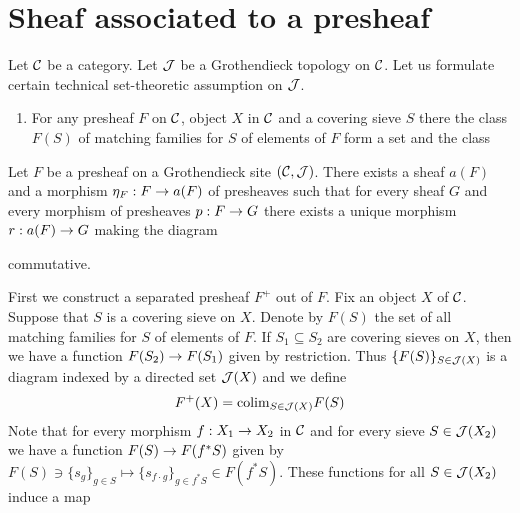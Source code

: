 \section{Sheaf associated to a presheaf}
\noindent
Let ${\mathcal C}$ be a category. 
\noindent
Let ${\mathcal J}$ be a Grothendieck topology on ${\mathcal C}$. Let us formulate certain technical set-theoretic assumption on ${\mathcal J}$.
\begin{enumerate}[label=\textbf{($\star$)}, leftmargin=1.5em]
\item For any presheaf $F$ on ${\mathcal C}$, object $X$ in ${\mathcal C}$ and a covering sieve $S$ there the class $F(S)$ of matching families for $S$ of elements of $F$ form a set and the class 
\end{enumerate}

\begin{theorem}\label{theorem:associatedsheaf}
Let $F$ be a presheaf on a Grothendieck site $({\mathcal C},{\mathcal J})$. There exists a sheaf $a(F)$ and a morphism $\eta_F:F \rightarrow a(F)$ of presheaves such that for every sheaf $G$ and every morphism of presheaves $p:F \rightarrow G$ there exists a unique morphism $r:a(F)\rightarrow G$ making the diagram
\begin{center}
\end{center}
commutative.
\end{theorem}
\noindent
First we construct a separated presheaf $F^+$ out of $F$. Fix an object $X$ of ${\mathcal C}$. Suppose that $S$ is a covering sieve on $X$. Denote by $F(S)$ the set of all matching families for $S$ of elements of $F$. If $S_1\subseteq S_2$ are covering sieves on $X$, then we have a function $F(S_2)\rightarrow F(S_1)$ given by restriction. Thus $\{F(S)\}_{S\in {\mathcal J}(X)}$ is a diagram indexed by a directed set ${\mathcal J}(X)$ and we define
$$F^+(X)=\mathrm{colim}_{S\in {\mathcal J}(X)}F(S)$$
Note that for every morphism $f:X_1\rightarrow X_2$ in ${\mathcal C}$ and for every sieve $S\in {\mathcal J}(X_2)$ we have a function $F(S)\rightarrow F(f^*S)$ given by $F(S)\ni \{s_g\}_{g\in S}\mapsto \{s_{f\cdot g}\}_{g\in f^*S}\in F(f^*S)$. These functions for all $S\in {\mathcal J}(X_2)$ induce a map
